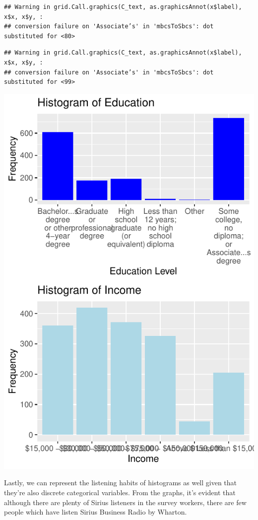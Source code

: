 \documentclass[
]{article}
\begin{document}
\begin{verbatim}
## Warning in grid.Call.graphics(C_text, as.graphicsAnnot(x$label), x$x, x$y, :
## conversion failure on 'Associate’s' in 'mbcsToSbcs': dot substituted for <80>
\end{verbatim}

\begin{verbatim}
## Warning in grid.Call.graphics(C_text, as.graphicsAnnot(x$label), x$x, x$y, :
## conversion failure on 'Associate’s' in 'mbcsToSbcs': dot substituted for <99>
\end{verbatim}

\includegraphics{hw1_sp2022_files/figure-latex/unnamed-chunk-12-1.pdf}

Lastly, we can represent the listening habits of histograms as well
given that they're also discrete categorical variables. From the graphs,
it's evident that although there are plenty of Sirius listeners in the
survey workers, there are few people which have listen Sirius Business
Radio by Wharton.
\end{document}
